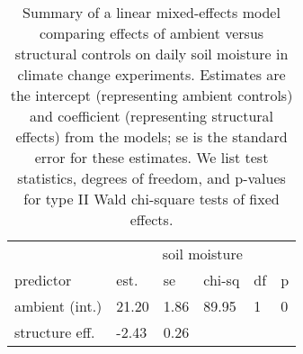 \documentclass{article}
\begin{document}
\begin{table}[ht]
\centering
\caption{Summary of a linear mixed-effects model comparing effects of ambient versus structural controls on daily soil moisture in climate change experiments. Estimates are the intercept (representing ambient controls) and coefficient (representing structural effects) from the models; se is the standard error for these estimates. We list test statistics, degrees of freedom, and p-values for type II Wald chi-square tests of fixed effects.} 
\label{table:shamamb_soilmois}
\begin{tabular}{|p{}|p{}p{}p{}p{}p{}|}
  \hline
  &\multicolumn{5}{c}{soil moisture}\\
 predictor & est. & se & chi-sq & df & p\\
 \hline
ambient (int.) & 21.20 & 1.86 & 89.95 & 1 & 0 \\ 
  structure eff. & -2.43 & 0.26 &  &  &  \\ 
   \hline
\end{tabular}
\end{table}\clearpage
\end{document}
